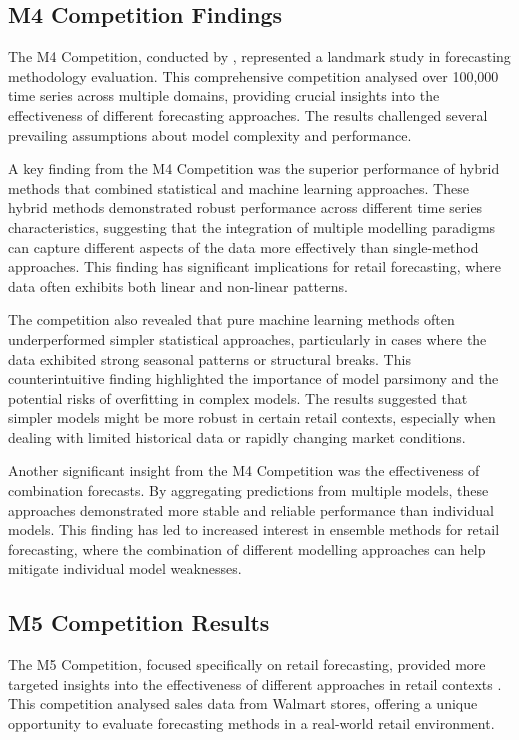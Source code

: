 \documentclass[12pt,a4paper]{report}
\begin{document}
\subsection{M4 Competition Findings}

The M4 Competition, conducted by \citet{makridakis2020m4}, represented a landmark study in forecasting methodology evaluation. This comprehensive competition analysed over 100,000 time series across multiple domains, providing crucial insights into the effectiveness of different forecasting approaches. The results challenged several prevailing assumptions about model complexity and performance.

A key finding from the M4 Competition was the superior performance of hybrid methods that combined statistical and machine learning approaches. These hybrid methods demonstrated robust performance across different time series characteristics, suggesting that the integration of multiple modelling paradigms can capture different aspects of the data more effectively than single-method approaches. This finding has significant implications for retail forecasting, where data often exhibits both linear and non-linear patterns.

The competition also revealed that pure machine learning methods often underperformed simpler statistical approaches, particularly in cases where the data exhibited strong seasonal patterns or structural breaks. This counterintuitive finding highlighted the importance of model parsimony and the potential risks of overfitting in complex models. The results suggested that simpler models might be more robust in certain retail contexts, especially when dealing with limited historical data or rapidly changing market conditions.

Another significant insight from the M4 Competition was the effectiveness of combination forecasts. By aggregating predictions from multiple models, these approaches demonstrated more stable and reliable performance than individual models. This finding has led to increased interest in ensemble methods for retail forecasting, where the combination of different modelling approaches can help mitigate individual model weaknesses.

\subsection{M5 Competition Results}

The M5 Competition, focused specifically on retail forecasting, provided more targeted insights into the effectiveness of different approaches in retail contexts \citep{makridakis2022m5}. This competition analysed sales data from Walmart stores, offering a unique opportunity to evaluate forecasting methods in a real-world retail environment.
\end{document}
